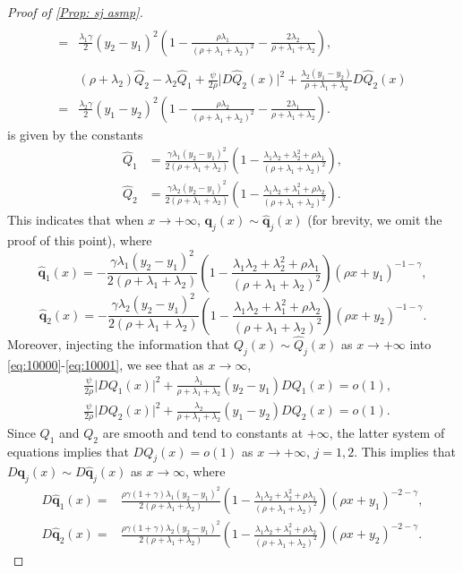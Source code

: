 \documentclass[11pt]{article}
\numberwithin{equation}{section}
\theoremstyle{definition}
\newcommand{\beq}{\begin{equation}}
\newcommand{\eeq}{\end{equation}}
\def\sq{{\boldsymbol{q}}}
\newcommand{\g}{\gamma}
\newcommand{\p}{\psi}
\newcommand{\lc}{\left(}
\newcommand{\rc}{\right)}
\theoremstyle{plain}
\begin{document}
\begin{appendices}
\begin{proof}[{}{Proof of \cref{Prop: sj asmp}}]
$$\begin{aligned}
\\
={}&{\frac{\lambda_1\g}{2}}(y_2-y_1)^2\lc 1-\frac{\rho \lambda_1}{(\rho+\lambda_1+\lambda_2)^2}-\frac{2\lambda_2}{\rho+\lambda_1+\lambda_2}\rc, \\ \\
   &\lc \rho+\lambda_2\rc \widehat Q_2-\lambda_2 \widehat Q_1    +\frac{\p}{2\rho}  \vert D\widehat Q_2(x)\vert^2
+\frac{ \lambda_2 (y_1-y_2)}{\rho+\lambda_1+\lambda_2} D\widehat Q_2(x)
     \\
={}&{\frac{\lambda_2\g}{2}}(y_1-y_2)^2\lc 1-\frac{\rho \lambda_2}{(\rho+\lambda_1+\lambda_2)^2}-\frac{2\lambda_1}{\rho+\lambda_1+\lambda_2}\rc.
    \end{aligned}
  $$
  is given by the constants
  $$
  \begin{aligned}
    \widehat Q_1& =
    {\frac{\g \lambda_1(y_2-y_1)^2}{2(\rho+\lambda_1+\lambda_2)}}\lc1-\frac{\lambda_1\lambda_2+\lambda_2^2+\rho \lambda_1}{(\rho+\lambda_1+\lambda_2)^2}\rc ,\\
    \widehat Q_2&={\frac{\g \lambda_2(y_2-y_1)^2}{2(\rho+\lambda_1+\lambda_2)}}\lc1-\frac{\lambda_1\lambda_2+\lambda_1^2+\rho \lambda_2}{(\rho+\lambda_1+\lambda_2)^2}\rc.
  \end{aligned}
  $$
  This indicates that  when $x\to +\infty$,  $\sq_j(x)\sim \widehat{\sq}_j(x)$
 {}{(for brevity, we omit the proof of this point)}, where
  \beq
  \widehat{\sq}_1(x)=-\frac{\g \lambda_1(y_2-y_1)^2}{2(\rho+\lambda_1+\lambda_2)}\lc1-\frac{\lambda_1\lambda_2+\lambda_2^2+\rho \lambda_1}{(\rho+\lambda_1+\lambda_2)^2}\rc \lc \rho x+y_1\rc^{-1-\g},
  \eeq
  \beq
  \widehat{\sq}_2(x)=-\frac{\g \lambda_2(y_2-y_1)^2}{2(\rho+\lambda_1+\lambda_2)}\lc1-\frac{\lambda_1\lambda_2+\lambda_1^2+\rho \lambda_2}{(\rho+\lambda_1+\lambda_2)^2}\rc \lc \rho x+y_2\rc^{-1-\g}.
  \eeq
  Moreover, injecting the information that  $Q_j(x)\sim \widehat{Q}_j(x)$  as $x\to +\infty$
  into \eqref{eq:10000}-\eqref{eq:10001}, we see that as $x\to \infty$,
  $$
  \begin{aligned}
     &
     \frac{\p}{2\rho}  \vert DQ_1(x)\vert^2
+ \frac{ \lambda_1}{\rho+\lambda_1+\lambda_2}(y_2-y_1) DQ_1(x)
=o(1),\\
  &
     \frac{\p}{2\rho}  \vert DQ_2(x)\vert^2
+ \frac{ \lambda_2}{\rho+\lambda_1+\lambda_2}(y_1-y_2) DQ_2(x)
=o(1).
    \end{aligned}
$$
Since $Q_1$ and $Q_2$ are smooth and tend to constants at $+\infty$, the latter system of equations implies that  {}{$DQ_j(x)=o(1)$}  as $x\to +\infty$, $j=1,2$.
This implies that $D\sq_j(x)\sim D\widehat{\sq}_j(x)$ as $x\to \infty$, 
where
$$
\begin{aligned}
  D\widehat{\sq}_1(x)
  ={}&\frac{\rho \g(1+\g)\lambda_1(y_2-y_1)^2}{2(\rho+\lambda_1+\lambda_2)}\lc1-\frac{\lambda_1\lambda_2+\lambda_2^2+\rho \lambda_1}{(\rho+\lambda_1+\lambda_2)^2}\rc \lc \rho x+y_1\rc^{-2-\g},\\
  D\widehat{\sq}_2(x)
  ={}&\frac{\rho \g(1+\g)\lambda_2(y_2-y_1)^2}{2(\rho+\lambda_1+\lambda_2)}\lc1-\frac{\lambda_1\lambda_2+\lambda_1^2+\rho \lambda_2}{(\rho+\lambda_1+\lambda_2)^2}\rc \lc \rho x+y_2\rc^{-2-\g}.
  \end{aligned}
  $$
  

\end{proof}
\end{appendices}
\end{document}
